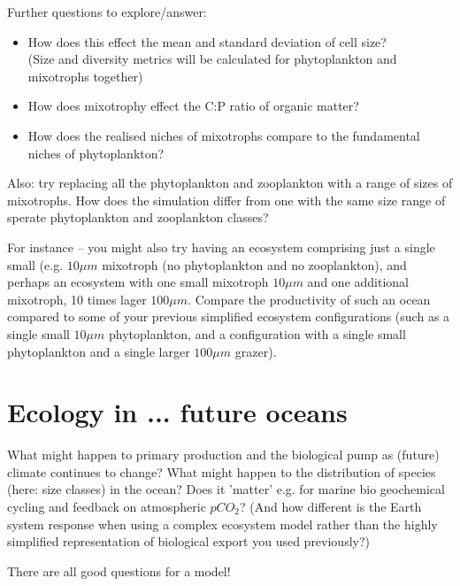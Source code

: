 \noindent Further questions to explore/answer:

\vspace{1mm}
\begin{itemize}
\item How does this effect the mean and standard deviation of cell size?\\(Size and diversity metrics will be calculated for phytoplankton and mixotrophs together)
\item How does mixotrophy effect the C:P ratio of organic matter?
\item How does the realised niches of mixotrophs compare to the fundamental niches of phytoplankton?
\end{itemize}

\vspace{1mm}
\noindent Also: try replacing all the phytoplankton and zooplankton with a range of sizes of mixotrophs. How does the simulation differ from one with the same size range of sperate phytoplankton and zooplankton classes?

For instance -- you might also try having an ecosystem comprising just a single small (e.g. \(10 \mu m\) mixotroph (no phytoplankton and no zooplankton), and perhaps an ecosystem with one small mixotroph \(10 \mu m\) and one additional mixotroph, 10 times lager \(100 \mu m\). Compare the productivity of such an ocean compared to some of your previous simplified ecosystem configurations (such as a single small \(10 \mu m\) phytoplankton, and a configuration with a single small phytoplankton and a single larger \(100 \mu m\) grazer).
%
\newpage

\section{Ecology in ... future oceans}

What might happen to primary production and the biological pump as (future) climate continues to change? What might happen to the distribution of species (here: size classes) in the ocean? Does it 'matter' e.g. for marine bio geochemical cycling and feedback on atmospheric \(pCO_{2}\)? (And how different is the Earth system response when using a complex ecosystem model rather than the highly simplified representation of biological export you used previously?)

\vspace{1mm}
There are all good questions for a model!

